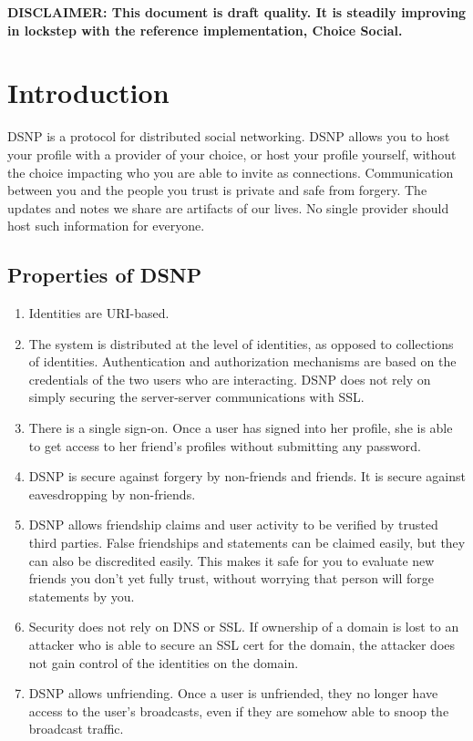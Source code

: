 \documentclass[letterpaper,11pt,oneside]{article}
\begin{document}
{\noindent\bf\large DISCLAIMER: This document is draft quality. It is steadily
improving in lockstep with the reference implementation, Choice Social.}

\newpage

\tableofcontents


\section{Introduction}

DSNP is a protocol for distributed social networking. DSNP allows you to host
your profile with a provider of your choice, or host your profile yourself,
without the choice impacting who you are able to invite as connections.
Communication between you and the people you trust is private and safe from
forgery. The updates and notes we share are artifacts of our lives. No single
provider should host such information for everyone. 

\subsection{Properties of DSNP}

\begin{enumerate}

\item Identities are URI-based.

\item The system is distributed at the level of identities, as opposed to
collections of identities. Authentication and authorization mechanisms are
based on the credentials of the two users who are interacting. DSNP does not
rely on simply securing the server-server communications with SSL.

\item There is a single sign-on. Once a user has signed into her profile, she
is able to get access to her friend's profiles without submitting any password.

\item DSNP is secure against forgery by non-friends and friends. It is secure
against eavesdropping by non-friends.

\item DSNP allows friendship claims and user activity to be verified by trusted
third parties. False friendships and statements can be claimed easily, but they
can also be discredited easily. This makes it safe for you to evaluate new
friends you don't yet fully trust, without worrying that person will forge
statements by you.

\item Security does not rely on DNS or SSL. If ownership of a domain is lost to
an attacker who is able to secure an SSL cert for the domain, the attacker does
not gain control of the identities on the domain.

\item DSNP allows unfriending. Once a user is unfriended, they no longer have
access to the user's broadcasts, even if they are somehow able to snoop the
broadcast traffic.

\end{enumerate}
\end{document}
